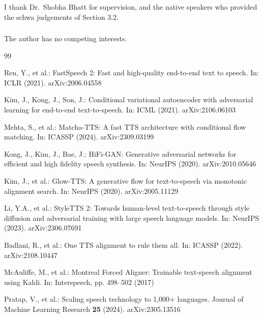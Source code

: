 \documentclass[runningheads]{llncs}
\begin{document}
\begin{credits}
\subsubsection{\ackname} I thank Dr.~Shobha Bhatt for supervision, and the
native speakers who provided the schwa judgements of Section 3.2.

\subsubsection{\discintname} The author has no competing interests.
\end{credits}

\begin{thebibliography}{99}

Ren, Y., et al.: FastSpeech 2: Fast and high-quality end-to-end text to
speech. In: ICLR (2021). arXiv:2006.04558

Kim, J., Kong, J., Son, J.: Conditional variational autoencoder with
adversarial learning for end-to-end text-to-speech. In: ICML (2021).
arXiv:2106.06103

Mehta, S., et al.: Matcha-TTS: A fast TTS architecture with conditional flow
matching. In: ICASSP (2024). arXiv:2309.03199

Kong, J., Kim, J., Bae, J.: HiFi-GAN: Generative adversarial networks for
efficient and high fidelity speech synthesis. In: NeurIPS (2020).
arXiv:2010.05646

Kim, J., et al.: Glow-TTS: A generative flow for text-to-speech via monotonic
alignment search. In: NeurIPS (2020). arXiv:2005.11129

Li, Y.A., et al.: StyleTTS 2: Towards human-level text-to-speech through style
diffusion and adversarial training with large speech language models. In:
NeurIPS (2023). arXiv:2306.07691

Badlani, R., et al.: One TTS alignment to rule them all. In: ICASSP (2022).
arXiv:2108.10447

McAuliffe, M., et al.: Montreal Forced Aligner: Trainable text-speech
alignment using Kaldi. In: Interspeech, pp. 498--502 (2017)

Pratap, V., et al.: Scaling speech technology to 1,000+ languages. Journal of
Machine Learning Research \textbf{25} (2024). arXiv:2305.13516


\end{thebibliography}
\end{document}
